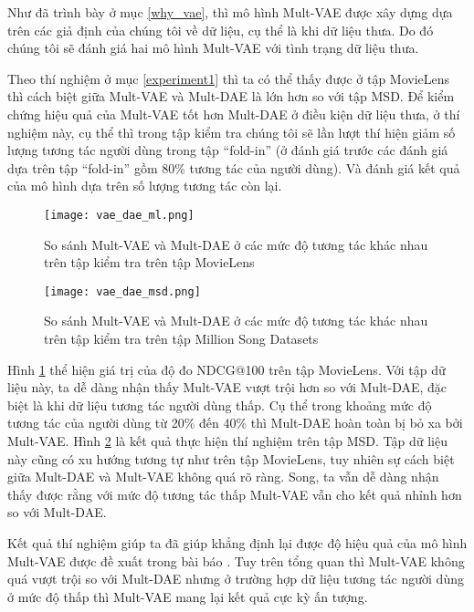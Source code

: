     Như đã trình bày ở mục \ref{why_vae}, thì mô hình Mult-VAE được xây dựng dựa trên các giả định của chúng tôi về dữ liệu, cụ thể là khi dữ liệu thưa.
    Do đó chúng tôi sẽ đánh giá hai mô hình Mult-VAE với tình trạng dữ liệu thưa.

    Theo thí nghiệm ở mục \ref{experiment1} thì ta có thể thấy được ở tập MovieLens thì cách biệt giữa Mult-VAE và Mult-DAE là lớn hơn so với tập MSD.
    Để kiểm chứng hiệu quả của Mult-VAE tốt hơn Mult-DAE ở điều kiện dữ liệu thưa, ở thí nghiệm này, cụ thể thì trong tập kiểm tra chúng tôi sẽ lần lượt thí hiện giảm số lượng tương tác người dùng trong tập ``fold-in'' (ở đánh giá trước các đánh giá dựa trên tập ``fold-in'' gồm 80\% tương tác của người dùng). Và đánh giá kết quả của mô hình dựa trên số lượng tương tác còn lại.
    
    \begin{figure}
        \centering
        \texttt{[image: vae\_dae\_ml.png]}
        \caption[So sánh Mult-VAE và Mult-DAE trên tập MovieLens]{So sánh Mult-VAE và Mult-DAE ở các mức độ tương tác khác nhau trên tập kiểm tra trên tập MovieLens}
        \label{fig_vae_dae_ml}
    \end{figure}
    \begin{figure}
        \centering
        \texttt{[image: vae\_dae\_msd.png]}
        \caption[So sánh Mult-VAE và Mult-DAE trên tập MSD]{So sánh Mult-VAE và Mult-DAE ở các mức độ tương tác khác nhau trên tập kiểm tra trên tập Million Song Datasets}
        \label{fig_vae_dae_msd}
    \end{figure}

    Hình \ref{fig_vae_dae_ml} thể hiện giá trị của độ đo NDCG@100 trên tập MovieLens. 
    Với tập dữ liệu này, ta dễ dàng nhận thấy Mult-VAE vượt trội hơn so với Mult-DAE, đặc biệt là khi dữ liệu tương tác người dùng thấp.
    Cụ thể trong khoảng mức độ tương tác của người dùng từ 20\% đến 40\% thì Mult-DAE hoàn toàn bị bỏ xa bởi Mult-VAE.
    Hình \ref{fig_vae_dae_msd} là kết quả thực hiện thí nghiệm trên tập MSD.
    Tập dữ liệu này cũng có xu hướng tương tự như trên tập MovieLens, tuy nhiên sự cách biệt giữa Mult-DAE và Mult-VAE không quá rõ ràng.
    Song, ta vẫn dễ dàng nhận thấy được rằng với mức độ tương tác thấp Mult-VAE vẫn cho kết quả nhỉnh hơn so với Mult-DAE.

    Kết quả thí nghiệm giúp ta đã giúp khẳng định lại được độ hiệu quả của mô hình Mult-VAE được đề xuất trong bài báo \cite{mvae}. 
    Tuy trên tổng quan thì Mult-VAE không quá vượt trội so với Mult-DAE nhưng ở trường hợp dữ liệu tương tác người dùng ở mức độ thấp thì Mult-VAE mang lại kết quả cực kỳ ấn tượng.

